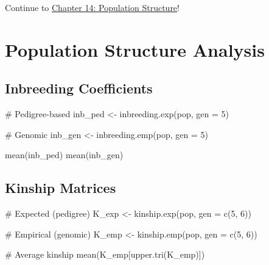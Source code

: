 \documentclass[
  letterpaper,
]{book}
\newenvironment{Shaded}{\begin{snugshade}}{\end{snugshade}}
\newcommand{\AttributeTok}[1]{\textcolor[rgb]{0.40,0.45,0.13}{#1}}
\newcommand{\CommentTok}[1]{\textcolor[rgb]{0.37,0.37,0.37}{#1}}
\newcommand{\DecValTok}[1]{\textcolor[rgb]{0.68,0.00,0.00}{#1}}
\newcommand{\FunctionTok}[1]{\textcolor[rgb]{0.28,0.35,0.67}{#1}}
\newcommand{\NormalTok}[1]{\textcolor[rgb]{0.00,0.23,0.31}{#1}}
\newcommand{\OtherTok}[1]{\textcolor[rgb]{0.00,0.23,0.31}{#1}}
\begin{document}
Continue to \href{14-population-structure.qmd}{Chapter 14: Population
Structure}!

\chapter{Population Structure Analysis}\label{sec-population-structure}

\section{Inbreeding Coefficients}\label{inbreeding-coefficients}

\begin{Shaded}
\begin{Highlighting}[]
\CommentTok{\# Pedigree{-}based}
\NormalTok{inb\_ped }\OtherTok{\textless{}{-}} \FunctionTok{inbreeding.exp}\NormalTok{(pop, }\AttributeTok{gen =} \DecValTok{5}\NormalTok{)}

\CommentTok{\# Genomic}
\NormalTok{inb\_gen }\OtherTok{\textless{}{-}} \FunctionTok{inbreeding.emp}\NormalTok{(pop, }\AttributeTok{gen =} \DecValTok{5}\NormalTok{)}

\FunctionTok{mean}\NormalTok{(inb\_ped)}
\FunctionTok{mean}\NormalTok{(inb\_gen)}
\end{Highlighting}
\end{Shaded}

\section{Kinship Matrices}\label{kinship-matrices}

\begin{Shaded}
\begin{Highlighting}[]
\CommentTok{\# Expected (pedigree)}
\NormalTok{K\_exp }\OtherTok{\textless{}{-}} \FunctionTok{kinship.exp}\NormalTok{(pop, }\AttributeTok{gen =} \FunctionTok{c}\NormalTok{(}\DecValTok{5}\NormalTok{, }\DecValTok{6}\NormalTok{))}

\CommentTok{\# Empirical (genomic)}
\NormalTok{K\_emp }\OtherTok{\textless{}{-}} \FunctionTok{kinship.emp}\NormalTok{(pop, }\AttributeTok{gen =} \FunctionTok{c}\NormalTok{(}\DecValTok{5}\NormalTok{, }\DecValTok{6}\NormalTok{))}

\CommentTok{\# Average kinship}
\FunctionTok{mean}\NormalTok{(K\_emp[}\FunctionTok{upper.tri}\NormalTok{(K\_emp)])}
\end{Highlighting}
\end{Shaded}
\end{document}
